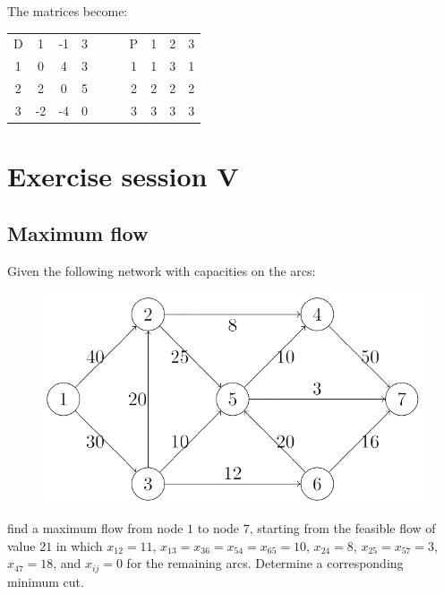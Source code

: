 \documentclass[12pt, a4paper]{report}
\newtheorem[style=M,bodystyle=\normalfont]{theorem}{Theorem}
\newtheorem[style=M,bodystyle=\normalfont]{corollary}{Corollary}
\newtheorem[style=M,bodystyle=\normalfont]{lemma}{Lemma}
\newtheorem[style=M,bodystyle=\normalfont]{definition}{Definition}
\begin{document}
\begin{enumerate}
                The matrices become: 
                \begin{table}[H]
                    \centering
                    \begin{tabular}{c|ccccc|ccc}
                    D & 1        & -1       & 3          & $\:\:\:\:\:\:$ & P & 1 & 2 & 3  \\ \cline{1-4} \cline{6-9} 
                    1 & 0        & 4        & 3          &                & 1 & 1 & 3 & 1  \\
                    2 & 2        & 0        & 5          &                & 2 & 2 & 2 & 2  \\
                    3 & -2       & -4       & 0          &                & 3 & 3 & 3 & 3  \\ 
                    \end{tabular}
                \end{table}
        \end{enumerate}

\newpage

\chapter{Exercise session V}
    \section{Maximum flow}
        Given the following network with capacities on the arcs: 
        \begin{figure}[H]
            \centering
            \includegraphics[width=0.5\linewidth]{images/maxfl.png}
        \end{figure}
        find a maximum flow from node $1$ to node $7$, starting from the feasible flow of value $21$ in which $x_{12} = 11$, $x_{13} = x_{36} = x_{54} = x_{65} = 10$, $x_{24} = 8$, $x_{25} = x_{57} = 3$, 
        $x_{47} = 18$, and $x_{ij} = 0$ for the remaining arcs. Determine a corresponding minimum cut.
\end{document}
